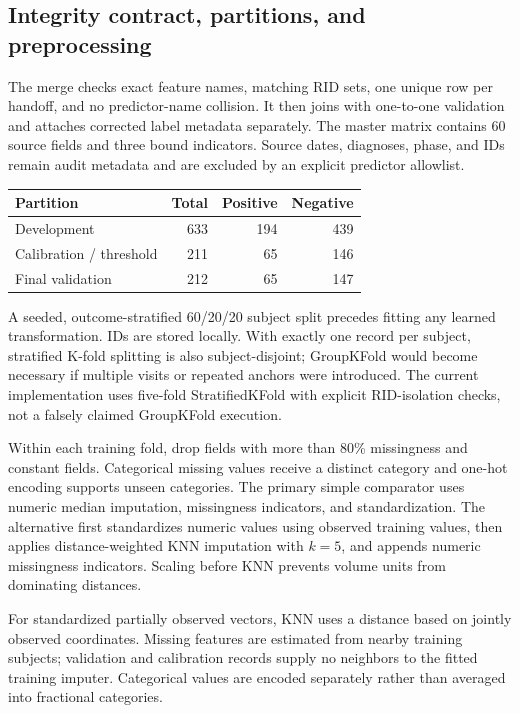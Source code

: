 \documentclass[11pt,a4paper]{article}
\begin{document}
\subsection{Integrity contract, partitions, and preprocessing}
The merge checks exact feature names, matching RID sets, one unique row per handoff, and no predictor-name collision. It then joins with one-to-one validation and attaches corrected label metadata separately. The master matrix contains 60 source fields and three bound indicators. Source dates, diagnoses, phase, and IDs remain audit metadata and are excluded by an explicit predictor allowlist.
\begin{center}\small
\begin{tabular}{lrrr}\hline
Partition & Total & Positive & Negative\\\hline
Development & 633 & 194 & 439\\
Calibration / threshold & 211 & 65 & 146\\
Final validation & 212 & 65 & 147\\
\hline\end{tabular}\end{center}
A seeded, outcome-stratified 60/20/20 subject split precedes fitting any learned transformation. IDs are stored locally. With exactly one record per subject, stratified K-fold splitting is also subject-disjoint; GroupKFold would become necessary if multiple visits or repeated anchors were introduced. The current implementation uses five-fold StratifiedKFold with explicit RID-isolation checks, not a falsely claimed GroupKFold execution.

Within each training fold, drop fields with more than 80\% missingness and constant fields. Categorical missing values receive a distinct category and one-hot encoding supports unseen categories. The primary simple comparator uses numeric median imputation, missingness indicators, and standardization. The alternative first standardizes numeric values using observed training values, then applies distance-weighted KNN imputation with $k=5$, and appends numeric missingness indicators. Scaling before KNN prevents volume units from dominating distances.

For standardized partially observed vectors, KNN uses a distance based on jointly observed coordinates. Missing features are estimated from nearby training subjects; validation and calibration records supply no neighbors to the fitted training imputer. Categorical values are encoded separately rather than averaged into fractional categories.
\end{document}
